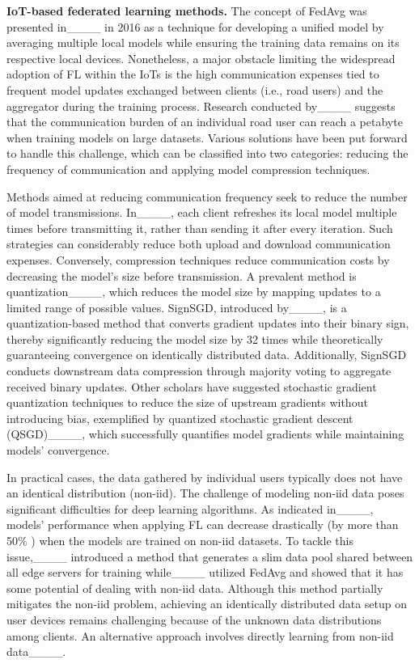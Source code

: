 \textbf{IoT-based federated learning methods.} 
The concept of FedAvg was presented in____ in 2016 as a technique for developing a unified model by averaging multiple local models while ensuring the training data remains on its respective local devices. Nonetheless, a major obstacle limiting the widespread adoption of FL within the IoTs is the high communication expenses tied to frequent model updates exchanged between clients (i.e., road users) and the aggregator during the training process. Research conducted by____ suggests that the communication burden of an individual road user can reach a petabyte when training models on large datasets. Various solutions have been put forward to handle this challenge, which can be classified into two categories: reducing the frequency of communication and applying model compression techniques.

Methods aimed at reducing communication frequency seek to reduce the number of model transmissions. In____, each client refreshes its local model multiple times before transmitting it, rather than sending it after every iteration. Such strategies can considerably reduce both upload and download communication expenses. 
Conversely, compression techniques reduce communication costs by decreasing the model's size before transmission.
A prevalent method is quantization____, which reduces the model size by mapping updates to a limited range of possible values. SignSGD, introduced by____, is a quantization-based method that converts gradient updates into their binary sign, thereby significantly reducing the model size by 32 times while theoretically guaranteeing convergence on identically distributed data. Additionally, SignSGD conducts downstream data compression through majority voting to aggregate received binary updates. Other scholars have suggested stochastic gradient quantization techniques to reduce the size of upstream gradients without introducing bias, exemplified by quantized stochastic gradient descent (QSGD)____, which successfully quantifies model gradients while maintaining models' convergence.

In practical cases, the data gathered by individual users typically does not have an identical distribution (non-iid). The challenge of modeling non-iid data poses significant difficulties for deep learning algorithms. As indicated in____, models' performance when applying FL can decrease drastically (by more than 50\% ) when the models are trained on non-iid datasets. To tackle this issue,____ introduced a method that generates a slim data pool shared between all edge servers for training while____ utilized FedAvg and showed that it has some potential of dealing with non-iid data. Although this method partially mitigates the non-iid problem, achieving an identically distributed data setup on user devices remains challenging because of the unknown data distributions among clients. An alternative approach involves directly learning from non-iid data____.

